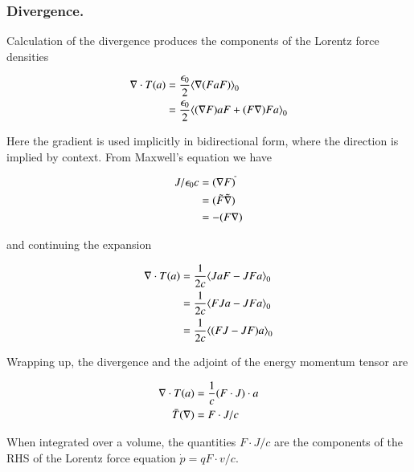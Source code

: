 \subsubsection{ Divergence. }

Calculation of the divergence produces the components of the Lorentz force densities

\begin{align*}
\nabla \cdot T(a)
&= \frac{\epsilon_0}{2} {\left\langle{{ \nabla(F a F) }}\right\rangle}_{0} \\
&= \frac{\epsilon_0}{2} {\left\langle{{ (\nabla F) a F + (F \nabla) F a }}\right\rangle}_{0} \\
\end{align*}

Here the gradient is used implicitly in bidirectional form, where the direction is implied by context.  From Maxwell's equation we have

\begin{align*}
J/\epsilon_0 c
&= (\nabla F)^{\tilde{}} \\
&= (\tilde{F} \tilde{\nabla}) \\
&= -(F \nabla)
\end{align*}

and continuing the expansion

\begin{align*}
\nabla \cdot T(a)
&= \frac{1}{2c} {\left\langle{{ J a F - J F a }}\right\rangle}_{0} \\
&= \frac{1}{2c} {\left\langle{{ F J a - J F a }}\right\rangle}_{0} \\
&= \frac{1}{2c} {\left\langle{{ (F J - J F) a }}\right\rangle}_{0} \\
\end{align*}

Wrapping up, the divergence and the adjoint of the energy momentum tensor are

\begin{align}
\nabla \cdot T(a) &= \frac{1}{c} (F \cdot J) \cdot a \\
\bar{T}(\nabla) &= F \cdot J/c
\end{align}

When integrated over a volume, the quantities $F \cdot J/c$ are the components of the RHS of the Lorentz force equation $\dot{p} = q F \cdot v/c$.

\EndArticle
